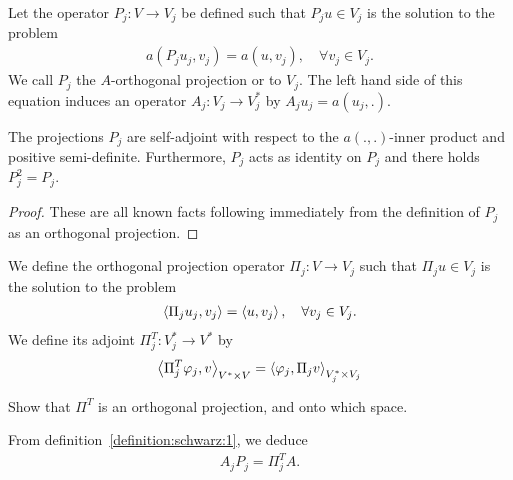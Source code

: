 \begin{definition}
  \label{definition:schwarz:1}
  Let the operator $P_j: V \to V_j$ be defined such that $P_j u \in V_j$ is
  the solution to the problem
  \begin{gather}
    \label{eq:schwarz:2}
    a(P_j u_j,v_j) = a(u,v_j),\quad\forall v_j\in V_j.
  \end{gather}
  We call $P_j$ the $A$-orthogonal projection or  to
  $V_j$. The left hand side of this equation induces an operator $A_j:
  V_j \to V_j^*$ by $A_j u_j = a(u_j,.)$.
\end{definition}

\begin{lemma}
  \label{lemma:schwarz:ritz}
  The projections $P_j$ are self-adjoint with respect to the
  $a(.,.)$-inner product and positive semi-definite. Furthermore,
  $P_j$ acts as identity on $P_j$ and there holds $P_j^2 = P_j$.
\end{lemma}
\begin{proof}
  These are all known facts following immediately from the definition
  of $P_j$ as an orthogonal projection.
\end{proof}

\begin{definition}
  \label{definition:schwarz:1a}
  We define the orthogonal projection operator
  $\Pi_j: V \to V_j$ such that $\Pi_j u\in V_j$ is the solution to the problem
  \begin{gather}
    \scal(\Pi_j u_j,v_j) = \scal(u,v_j),\quad\forall v_j\in V_j.
  \end{gather}
  We define its adjoint $\Pi_j^T: V_j^* \to V^*$ by
  \begin{gather}
    \label{eq:schwarz:3}
    \scal(\Pi_j^T \phi_j,v)_{V^*\times V} =  \scal( \phi_j,\Pi_j
    v)_{V_j^*\times V_j}
  \end{gather}
\end{definition}

\begin{todo}
  Show that $\Pi^T$ is an orthogonal projection, and onto which space.
\end{todo}

\begin{lemma}
  \label{lemma:schwarz:2}  
  From definition~\ref{definition:schwarz:1}, we deduce
  \begin{gather}
    \label{eq:schwarz:15}
    A_j P_j = \Pi^T_j A.
  \end{gather}
\end{lemma}

